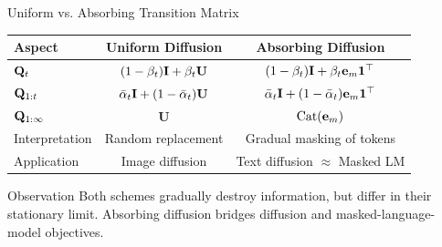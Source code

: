 \documentclass{beamer}
\renewcommand{\eqpause}{}
\begin{document}
\begin{frame}{Uniform vs. Absorbing Transition Matrix}
	\begin{table}[h!]
		\centering
		\small
		\begin{tabular}{lcc}
			\toprule
			\textbf{Aspect} & \textbf{Uniform Diffusion} & \textbf{Absorbing Diffusion} \\
			\midrule
			$\mathbf{Q}_t$
				& $(1-\beta_t)\mathbf{I} + \beta_t \mathbf{U}$ 
				& $(1-\beta_t)\mathbf{I} + \beta_t \mathbf{e}_m\mathbf{1}^\top$ \\[4pt]
			$\mathbf{Q}_{1:t}$
				& $\bar\alpha_t \mathbf{I} + (1-\bar\alpha_t)\mathbf{U}$
				& $\bar\alpha_t \mathbf{I} + (1-\bar\alpha_t)\mathbf{e}_m\mathbf{1}^\top$ \\[4pt]
			$\mathbf{Q}_{1:\infty}$
				& $\mathbf{U}$
				& $\operatorname{Cat}(\mathbf{e}_m)$ \\[4pt]
			Interpretation
				& Random replacement
				& Gradual masking of tokens \\[4pt]
			Application
				& Image diffusion
				& Text diffusion $\approx$ Masked LM \\[4pt]
			\bottomrule
		\end{tabular}
	\end{table}
	\eqpause
	\begin{block}{Observation}
		Both schemes gradually destroy information, but differ in their stationary limit.
		Absorbing diffusion bridges diffusion and masked-language-model objectives.
	\end{block}
\end{frame}
\end{document}
